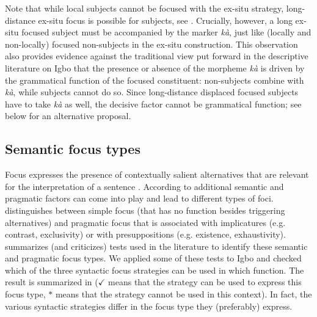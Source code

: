 \documentclass[output=paper,colorlinks,citecolor=brown]{langscibook}
\begin{document}
Note that while local subjects cannot be focused with the ex-situ strategy, long-distance ex-situ focus is possible for subjects, see . Crucially, however, a long ex-situ focused subject must be accompanied by the marker \textit{k\`a}, just like (locally and non-locally) focused non-subjects in the ex-situ construction. This observation also provides evidence against the traditional view put forward in the descriptive literature on Igbo that the presence or absence of the morpheme \textit{k\`a} is driven by the grammatical function of the focused constituent: non-subjects combine with \textit{k\`a}, while subjects cannot do so. Since long-distance displaced focused subjects have to take \textit{k\`a} as well, the decisive factor cannot be grammatical function; see below for an alternative proposal.

\subsection{Semantic focus types}\label{sec:amaechi:2.2}

Focus expresses the presence of contextually salient alternatives that are relevant for the interpretation of a sentence \citep{Rooth1985, Rooth1992}. According to \citet{ZimmermannOnea2011} additional semantic and pragmatic factors can come into play and lead to different types of foci. \citet{Bazalgette2015} distinguishes between simple focus (that has no function besides triggering alternatives) and pragmatic focus that is associated with implicatures (e.g. contrast, exclusivity) or with presuppositions (e.g. existence, exhaustivity). \citet{VanDerWal2016} summarizes (and criticizes) tests used in the literature to identify these semantic and pragmatic focus types. We applied some of these tests to Igbo and checked which of the three syntactic focus strategies can be used in which function. The result is summarized in  ($\checkmark$ means that the strategy can be used to express this focus type, $\ast$ means that the strategy cannot be used in this context). In fact, the various syntactic strategies differ in the focus type they (preferably) express.

\end{document}
